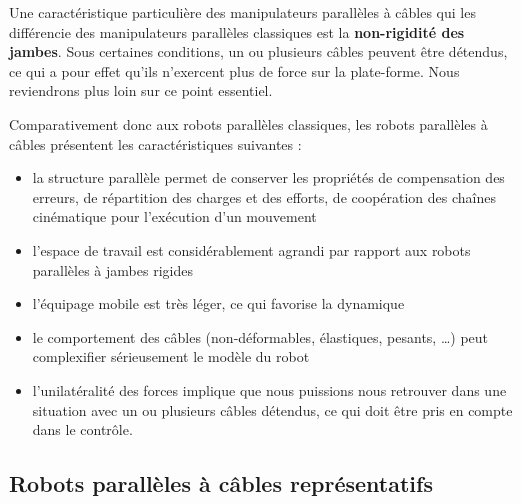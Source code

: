 Une caractéristique particulière des manipulateurs parallèles à câbles qui les 
différencie des manipulateurs parallèles classiques est la {\bf non-rigidité 
des 
jam\-bes}. Sous certaines conditions, un ou plusieurs câbles peuvent être 
détendus, ce qui a pour effet qu'ils n'exercent plus de force sur la 
plate-forme. Nous reviendrons plus loin sur ce point essentiel.

Comparativement donc aux robots parallèles classiques, les robots parallèles à 
câbles présentent les caractéristiques suivantes :
\begin{itemize}
 \item la structure parallèle permet de conserver les propriétés de 
compensation 
des erreurs, de répartition des charges et des efforts, de coopération des 
chaînes cinématique pour l'exécution d'un mouvement
 \item l'espace de travail est considérablement agrandi par rapport aux robots 
parallèles à jambes rigides
 \item l'équipage mobile est très léger, ce qui favorise la dynamique
 \item le comportement des câbles (non-déformables, élastiques, pesants, \dots) 
peut complexifier s\'erieusement le modèle du robot
 \item l'unilatéralité des forces implique que nous puissions nous retrouver 
dans une situation avec un ou plusieurs câbles détendus, ce qui doit être pris 
en compte dans le contrôle.
\end{itemize}


\subsection{Robots parall\`eles à c\^ables repr\'esentatifs} \label{chap0-1-0}

